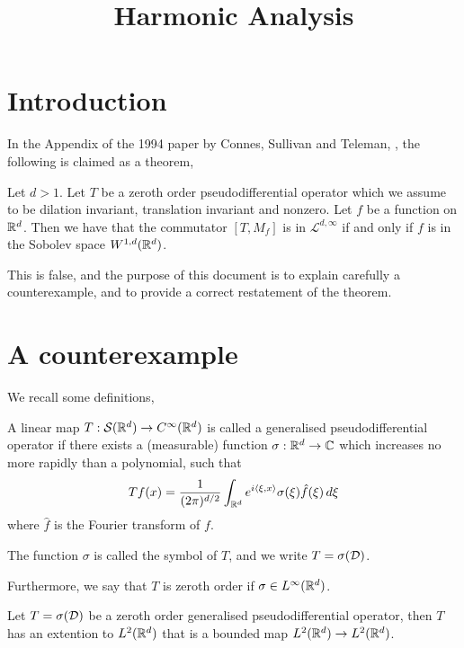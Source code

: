 \documentclass{unswmaths}
\begin{document}
\subject{Homogeneous Pseudodifferential Operators}
\author{}
\title{Harmonic Analysis}


\newcommand{\Sc}{\mathcal{S}}
\setlength\parindent{0pt}

\newcommand{\iD}{\D}


\section{Introduction}
In the Appendix of the 1994 paper by Connes, Sullivan and Teleman, \cite{CST}, the following
is claimed as a theorem,

Let $d > 1$. Let $T$ be a zeroth order pseudodifferential operator which we
assume to be dilation invariant, translation invariant and nonzero. Let $f$
be a function on $\mathbb{R}^d$. Then we have that the commutator
$[T,M_f]$ is in $\mathcal{L}^{d,\infty}$ if and only if $f$ is in the Sobolev
space $W^{1,d}(\mathbb{R}^d)$. 

This is false, and the purpose of this document is to explain carefully
a counterexample, and to provide a correct restatement of the theorem.

\section{A counterexample}
We recall some definitions, 
\begin{definition}
    A linear map $T:\Sc(\Rl^d)\to C^\infty(\Rl^d)$ is called
    a generalised pseudodifferential operator
    if there exists a (measurable) function $\sigma:\mathbb{R}^d\to\mathbb{C}$
    which increases no more rapidly than a polynomial, such that
    \begin{equation}
        Tf(x) = \frac{1}{(2\pi)^{d/2}}\int_{\mathbb{R}^d} e^{i\langle \xi,x\rangle} \sigma(\xi) \hat{f}(\xi)\,d\xi
    \end{equation}
    where $\hat{f}$ is the Fourier transform of $f$.
    
    The function $\sigma$ is called the symbol of $T$, and 
    we write $T = \sigma(\iD)$. 
    
    Furthermore, we say that $T$ is zeroth order if $\sigma \in L^\infty(\mathbb{R}^d)$.
\end{definition}

\begin{proposition}
    Let $T = \sigma(\iD)$ be a zeroth
    order generalised pseudodifferential operator, then $T$ has an extention to $L^2(\mathbb{R}^d)$ that is a bounded map $L^2(\mathbb{R}^d)\to L^2(\mathbb{R}^d)$.
\end{proposition}
\end{document}
